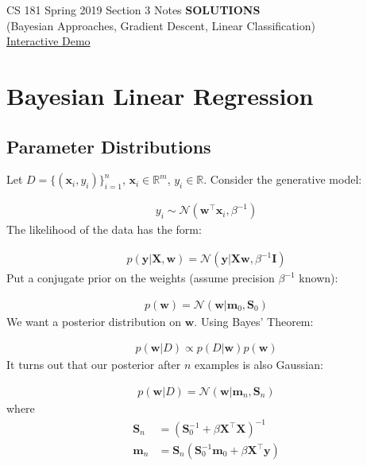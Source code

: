 \documentclass[12pt,letterpaper]{article}
\begin{document}
\begin{center}
    CS 181 Spring 2019 Section 3 Notes \textbf{SOLUTIONS}\\
(Bayesian Approaches, Gradient Descent, Linear Classification)\\
\href{https://colab.research.google.com/drive/1AJRaGeqgTosVNWjinYPahB1RHGAOwIh-}{Interactive Demo}
\end{center}



\section{Bayesian Linear Regression}

\subsection{Parameter Distributions}

Let $D = \{(\mathbf{x}_i, y_i)\}_{i=1}^n$, $\mathbf{x}_i \in \mathbb{R}^m$, $y_i \in \mathbb{R}$. Consider the generative model:

\begin{align}
y_i \sim \mathcal{N}(\mathbf{w}^\top \mathbf{x}_i, \beta^{-1})
\end{align}
\noindent The likelihood of the data has the form:

\begin{align}
    p(\mathbf{y}|\mathbf{X},\mathbf{w}) = \mathcal{N}(\mathbf{y}|\mathbf{X}\mathbf{w},\beta^{-1}\mathbf{I})
\end{align}
\noindent Put a conjugate prior on the weights (assume precision $\beta^{-1}$ known):

\begin{align}
    p(\mathbf{w}) = \mathcal{N}(\mathbf{w}|\mathbf{m}_0, \mathbf{S}_0)
\end{align}
\noindent We want a posterior distribution on $\mathbf{w}$. Using Bayes' Theorem:

\begin{align}
    p(\mathbf{w}|D) \propto p(D|\mathbf{w})p(\mathbf{w})
\end{align}
\noindent It turns out that our posterior after $n$ examples is also Gaussian:

\begin{align}
    p(\mathbf{w}|D) = \mathcal{N}(\mathbf{w}|\mathbf{m}_n, \mathbf{S}_n)
\end{align}
where
\begin{align}
    \mathbf{S}_n &= \left(\mathbf{S}_0^{-1} + \beta \mathbf{X}^\top\mathbf{X}\right)^{-1}\\
    \mathbf{m}_n &= \mathbf{S}_n(\mathbf{S}_0^{-1}\mathbf{m}_0 + \beta \mathbf{X}^\top\mathbf{y})
\end{align}
\end{document}
